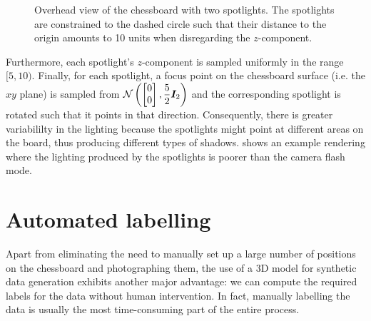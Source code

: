 \documentclass[../main.tex]{subfiles}
\begin{document}
\begin{enumerate}
\begin{figure}
            \caption[Overhead view of the chessboard with two spotlights.]{Overhead view of the chessboard with two spotlights. The spotlights are constrained to the dashed circle such that their distance to the origin amounts to 10 units when disregarding the $z$-component.}
            \label{fig:chessboard_lighting_circle}
        \end{figure}
        Furthermore, each spotlight's $z$-component is sampled uniformly in the range $[5, 10)$.
        Finally, for each spotlight, a focus point on the chessboard surface (i.e. the $xy$ plane) is sampled from
        \(
            \mathcal{N}\left(
                \begin{bmatrix}
                    0 \\ 0
                \end{bmatrix},
                \displaystyle \frac{5}{2} {\bm{I}}_2
            \right)
        \)
        and the corresponding spotlight is rotated such that it points in that direction.
        Consequently, there is greater variabililty in the lighting because the spotlights might point at different areas on the board, thus producing different types of shadows.
         shows an example rendering where the lighting produced by the spotlights is poorer than the camera flash mode.
\end{enumerate}

\section{Automated labelling}
Apart from eliminating the need to manually set up a large number of positions on the chessboard and photographing them, the use of a 3D model for synthetic data generation exhibits another major advantage: we can compute the required labels for the data without human intervention.
In fact, manually labelling the data is usually the most time-consuming part of the entire process.
\end{document}
